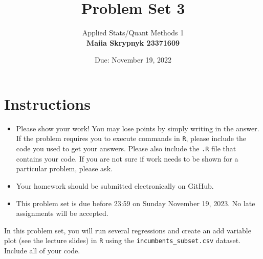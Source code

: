 \documentclass[12pt,letterpaper]{article}
\title{Problem Set 3}
\date{Due: November 19, 2022}
\author{Applied Stats/Quant Methods 1 \\ \vspace{\baselineskip}
	 \textbf{Maiia Skrypnyk 23371609}}
\begin{document}
	\maketitle
	\section*{Instructions}
	\begin{itemize}
		\item Please show your work! You may lose points by simply writing in the answer. If the problem requires you to execute commands in \texttt{R}, please include the code you used to get your answers. Please also include the \texttt{.R} file that contains your code. If you are not sure if work needs to be shown for a particular problem, please ask.
	\item Your homework should be submitted electronically on GitHub.
	\item This problem set is due before 23:59 on Sunday November 19, 2023. No late assignments will be accepted.

	\end{itemize}

		\vspace{.25cm}
	
\noindent In this problem set, you will run several regressions and create an add variable plot (see the lecture slides) in \texttt{R} using the \texttt{incumbents\_subset.csv} dataset. Include all of your code.

	\vspace{.5cm}
\end{document}
